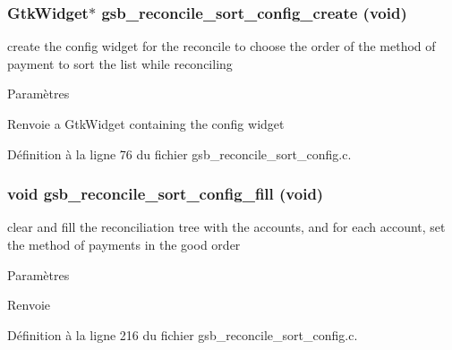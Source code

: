 \subsubsection[{gsb\_\-reconcile\_\-sort\_\-config\_\-create}]{\setlength{\rightskip}{0pt plus 5cm}GtkWidget$\ast$ gsb\_\-reconcile\_\-sort\_\-config\_\-create (void)}\label{gsb__reconcile__sort__config_8c_a9b08fc70938b33509231ca9cc5b8745f}
create the config widget for the reconcile to choose the order of the method of payment to sort the list while reconciling


\begin{DoxyParams}{Paramètres}
\item[{\em }]\end{DoxyParams}
\begin{DoxyReturn}{Renvoie}
a GtkWidget containing the config widget 
\end{DoxyReturn}


Définition à la ligne 76 du fichier gsb\_\-reconcile\_\-sort\_\-config.c.

\subsubsection[{gsb\_\-reconcile\_\-sort\_\-config\_\-fill}]{\setlength{\rightskip}{0pt plus 5cm}void gsb\_\-reconcile\_\-sort\_\-config\_\-fill (void)}\label{gsb__reconcile__sort__config_8c_ae0e1a7adc48388316184a5b8a53ef582}
clear and fill the reconciliation tree with the accounts, and for each account, set the method of payments in the good order


\begin{DoxyParams}{Paramètres}
\item[{\em }]\end{DoxyParams}
\begin{DoxyReturn}{Renvoie}

\end{DoxyReturn}


Définition à la ligne 216 du fichier gsb\_\-reconcile\_\-sort\_\-config.c.

